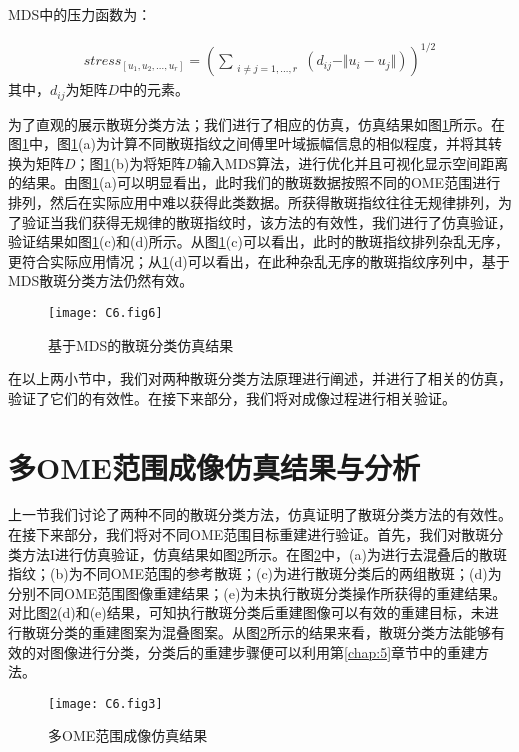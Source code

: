 MDS中的压力函数为：

\begin{equation}
\begin{aligned}
stress_{[u_1,u_2,\ldots, u_r]} =\left( \sum_{\substack{i\neq j = 1,\ldots,r} } (d_{ij}-\Vert u_{i}- u_{j} \Vert ) \right)^{1/2}
\label{eq:6.7}
\end{aligned}
\end{equation}
其中，$d_{ij}$为矩阵$D$中的元素。

为了直观的展示散斑分类方法；我们进行了相应的仿真，仿真结果如图\ref{fig:6.6}所示。在图\ref{fig:6.6}中，图\ref{fig:6.6}(a)为计算不同散斑指纹之间傅里叶域振幅信息的相似程度，并将其转换为矩阵$D$；图\ref{fig:6.6}(b)为将矩阵$D$输入MDS算法，进行优化并且可视化显示空间距离的结果。由图\ref{fig:6.6}(a)可以明显看出，此时我们的散斑数据按照不同的OME范围进行排列，然后在实际应用中难以获得此类数据。所获得散斑指纹往往无规律排列，为了验证当我们获得无规律的散斑指纹时，该方法的有效性，我们进行了仿真验证，验证结果如图\ref{fig:6.6}(c)和(d)所示。从图\ref{fig:6.6}(c)可以看出，此时的散斑指纹排列杂乱无序，更符合实际应用情况；从\ref{fig:6.6}(d)可以看出，在此种杂乱无序的散斑指纹序列中，基于MDS散斑分类方法仍然有效。
\begin{figure}[htp]
	\centering
	\texttt{[image: C6.fig6]}
	\caption{基于MDS的散斑分类仿真结果}
	\label{fig:6.6}
\end{figure}

在以上两小节中，我们对两种散斑分类方法原理进行阐述，并进行了相关的仿真，验证了它们的有效性。在接下来部分，我们将对成像过程进行相关验证。

\section{多OME范围成像仿真结果与分析}

上一节我们讨论了两种不同的散斑分类方法，仿真证明了散斑分类方法的有效性。在接下来部分，我们将对不同OME范围目标重建进行验证。首先，我们对散斑分类方法I进行仿真验证，仿真结果如图\ref{fig:6.3}所示。在图\ref{fig:6.3}中，(a)为进行去混叠后的散斑指纹；(b)为不同OME范围的参考散斑；(c)为进行散斑分类后的两组散斑；(d)为分别不同OME范围图像重建结果；(e)为未执行散斑分类操作所获得的重建结果。对比图\ref{fig:6.3}(d)和(e)结果，可知执行散斑分类后重建图像可以有效的重建目标，未进行散斑分类的重建图案为混叠图案。从图\ref{fig:6.3}所示的结果来看，散斑分类方法能够有效的对图像进行分类，分类后的重建步骤便可以利用第\ref{chap:5}章节中的重建方法。

\begin{figure}[htp]
	\centering
	\texttt{[image: C6.fig3]}
	\caption{多OME范围成像仿真结果}
	\label{fig:6.3}
\end{figure}

